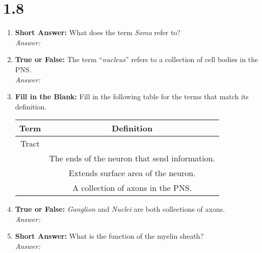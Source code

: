 \section*{1.8 \squigglyline}
\begin{enumerate}[label=\textbf{Q1.8.\arabic*}]

      \item \textbf{Short Answer:} What does the term \textit{Soma} refer to? \\
            \textit{Answer:}%

      \item \textbf{True or False:} The term ``\textit{nucleus}'' refers to a collection of cell bodies in the PNS. \\
            \textit{Answer:} %

      \item \textbf{Fill in the Blank:} Fill in the following table for the terms that match its definition. \\

            \begin{tabular}[htbp]{cc}
                  \toprule
                  \textbf{Term}            & \textbf{Definition}                           \\ \midrule
                  Tract                    & \underline{\hspace{10cm}}                     \\[0.5em]
                  \underline{\hspace{3cm}} & The ends of the neuron that send information. \\[0.5em]
                  \underline{\hspace{3cm}} & Extends surface area of the neuron.           \\[0.5em]
                  \underline{\hspace{3cm}} & A collection of axons in the PNS.             \\        \bottomrule
            \end{tabular}

      \item \textbf{True or False:} \textit{Ganglion} and \textit{Nuclei} are both collections of axons. \\
            \textit{Answer:} %

      \item \textbf{Short Answer:} What is the function of the myelin sheath? \\
            \textit{Answer:} %
\end{enumerate}


